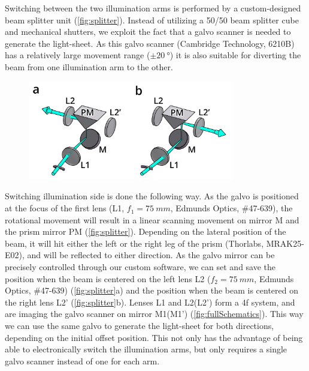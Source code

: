     \label{sec:splitter}

    Switching between the two illumination arms is performed by a custom-designed beam splitter unit (\autoref{fig:splitter}). Instead of utilizing a 50/50 beam splitter cube and mechanical shutters, we exploit the fact that a galvo scanner is needed to generate the light-sheet. As this galvo scanner (Cambridge Technology, 6210B) has a relatively large movement range ($\pm \SI{20}{\degree}$) it is also suitable for diverting the beam from one illumination arm to the other.

    \begin{figure}[htb]
      \centering
      \includegraphics[width=0.8\textwidth]{SW/splitterFigure}
      \label{fig:splitter}
    \end{figure}

    Switching illumination side is done the following way. As the galvo is positioned at the focus of the first lens (L1, $f_1 = \SI{75}{mm}$, Edmunds Optics, \#47-639), the rotational movement will result in a linear scanning movement on mirror M and the prism mirror PM (\autoref{fig:splitter}). Depending on the lateral position of the beam, it will hit either the left or the right leg of the prism (Thorlabs, MRAK25-E02), and will be reflected to either direction. As the galvo mirror can be precisely controlled through our custom software, we can set and save the position when the beam is centered on the left lens L2 ($f_2 = \SI{75}{mm}$, Edmunds Optics, \#47-639) (\autoref{fig:splitter}a) and the position when the beam is centered on the right lens L2' (\autoref{fig:splitter}b). Lenses L1 and L2(L2') form a 4f system, and are imaging the galvo scanner on mirror M1(M1') (\autoref{fig:fullSchematics}). This way we can use the same galvo to generate the light-sheet for both directions, depending on the initial offset position. This not only has the advantage of being able to electronically switch the illumination arms, but only requires a single galvo scanner instead of one for each arm.
    
